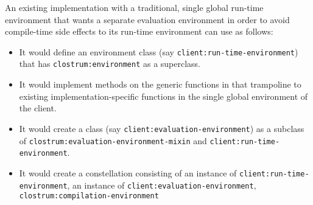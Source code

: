 An existing \commonlisp{} implementation with a traditional, single
global run-time environment that wants a separate evaluation
environment in order to avoid compile-time side effects to its
run-time environment can use \sysname{} as follows:

\begin{itemize}
\item It would define an environment class  (say
  \texttt{client:run-time-environment}) that has
  \texttt{clostrum:environment} as a superclass.
\item It would implement methods on the generic functions in
   that trampoline to existing
  implementation-specific functions in the single global environment
  of the client.
\item It would create a class (say
  \texttt{client:evaluation-environment}) as a subclass of
  \texttt{clostrum:evaluation-environment-mixin} and
  \texttt{client:run-time-environment}.
\item It would create a constellation consisting of an instance of
  \texttt{client:run-time-environment}, an instance of
  \texttt{client:evaluation-environment},
  \texttt{clostrum:compilation-environment}
\end{itemize}
